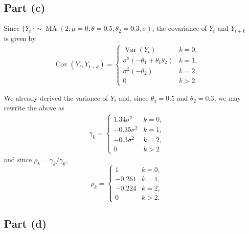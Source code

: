 \documentclass[
]{article}
\begin{document}
\hypertarget{part-c}{%
\subsection{Part (c)}\label{part-c}}


Since
\(\{Y_t\} \sim \operatorname{MA}(2; \mu=0,\theta=0.5, \theta_2=0.3, \sigma)\),
the covariance of \(Y_t\) and \(Y_{t+k}\) is given by \begin{align}
   \operatorname{Cov}(Y_t,Y_{t+k}) =
   \begin{cases}
      \operatorname{Var}(Y_t)                               & k = 0,\\
      \sigma^2(-\theta_1 + \theta_1 \theta_2) & k = 1,\\
      \sigma^2(-\theta_2)                     & k = 2,\\
      0                                       & k > 2.
   \end{cases}
\end{align}

We already derived the variance of \(Y_t\) and, since \(\theta_1 = 0.5\)
and \(\theta_2 = 0.3\), we may rewrite the above as \begin{align}
   \gamma_k =
   \begin{cases}
      1.34 \sigma^2     & k = 0,\\
      -0.35 \sigma^2    & k = 1,\\
      -0.3 \sigma^2     & k = 2,\\
      0                 & k > 2
   \end{cases}
\end{align} and since \(\rho_k = \gamma_k / \gamma_0\), \begin{equation}
   \rho_k =
   \begin{cases}
      1           & k = 0,\\
      -0.261      & k = 1,\\
      -0.224      & k = 2,\\
      0           & k > 2.
   \end{cases}
\end{equation}

\hypertarget{part-d}{%
\subsection{Part (d)}\label{part-d}}
\end{document}
